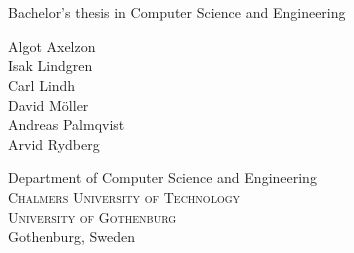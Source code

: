 \begin{titlepage}
\mbox{}
\renewcommand{\familydefault}{\sfdefault} \normalfont %

\textbf{\Huge \multiLineTitle{0.2cm}} 
\\[0.5cm]
{\Large \oneLineSubtitle}\\[0.5cm]
Bachelor's thesis in Computer Science and Engineering

\setlength{\parskip}{1cm}

{\Large Algot Axelzon} \setlength{\parskip}{2.9cm}\\[1ex]
{\Large Isak Lindgren} \setlength{\parskip}{2.9cm}\\[1ex]
{\Large Carl Lindh} \setlength{\parskip}{2.9cm}\\[1ex]
{\Large David Möller} \setlength{\parskip}{2.9cm}\\[1ex]
{\Large Andreas Palmqvist} \setlength{\parskip}{2.9cm}\\[1ex]
{\Large Arvid Rydberg} \setlength{\parskip}{2.9cm}

Department of Computer Science and Engineering \\
\textsc{Chalmers University of Technology} \\
\textsc{University of Gothenburg} \\
Gothenburg, Sweden \the\year

\renewcommand{\familydefault}{\rmdefault} \normalfont %
\end{titlepage}


\newpage
\restoregeometry
\thispagestyle{empty}
\mbox{}

